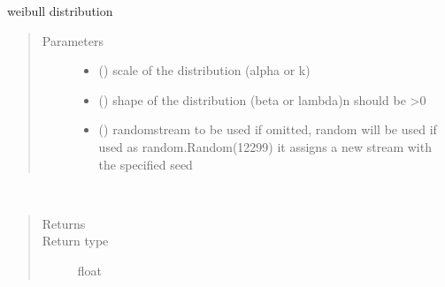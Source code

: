 \documentclass[letterpaper,10pt,english]{sphinxmanual}
\begin{document}

\begin{fulllineitems}
\label{\detokenize{Reference:salabim.Weibull}}
weibull distribution
\begin{quote}\begin{description}
\item[{Parameters}] \leavevmode\begin{itemize}
\item {} 
 () \textendash{} scale of the distribution (alpha or k)

\item {} 
 () \textendash{} shape of the distribution (beta or lambda)\textbar{}n\textbar{}
should be \textgreater{}0

\item {} 
 () \textendash{} randomstream to be used 
if omitted, random will be used 
if used as random.Random(12299)
it assigns a new stream with the specified seed

\end{itemize}

\end{description}\end{quote}

\begin{fulllineitems}
\label{\detokenize{Reference:salabim.Weibull.mean}}~\begin{quote}\begin{description}
\item[{Returns}] \leavevmode
{}

\item[{Return type}] \leavevmode
float

\end{description}\end{quote}

\end{fulllineitems}



\end{fulllineitems}
\end{document}
